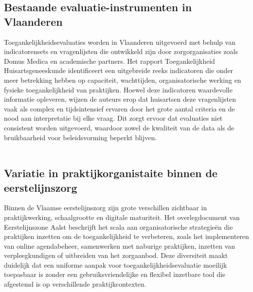 \subsection{Bestaande evaluatie-instrumenten in Vlaanderen}
\label{ter:Bestaande evaluatie-instrumenten in Vlaanderen}
Toegankelijkheidsevaluaties worden in Vlaanderen uitgevoerd met behulp van indicatorensets en vragenlijsten die ontwikkeld zijn door zorgorganisaties zoals Domus Medica en academische partners.
Het rapport Toegankelijkheid Huisartsgeneeskunde identificeert een uitgebreide reeks indicatoren die onder meer betrekking hebben op capaciteit, wachttijden, organisatorische werking en fysieke toegankelijkheid van praktijken.
Hoewel deze indicatoren waardevolle informatie opleveren, wijzen de auteurs erop dat huisartsen deze vragenlijsten vaak als complex en tijdsintensief ervaren door het grote aantal criteria en de nood aan interpretatie bij elke vraag.\autocite{Merckx2023}
Dit zorgt ervoor dat evaluaties niet consistent worden uitgevoerd, waardoor zowel de kwaliteit van de data als de bruikbaarheid voor beleidsvorming beperkt blijven.
\\\\
\subsection{Variatie in praktijkorganistaite binnen de eerstelijnszorg}
\label{ter:Variatie in praktijkorganistaite binnen de eerstelijnszorg}
Binnen de Vlaamse eerstelijnszorg zijn grote verschillen zichtbaar in praktijkwerking, schaalgrootte en digitale maturiteit.
Het overlegdocument \textcite{Rampelberg2025a} van Eerstelijnszone Aalst beschrijft het scala aan organisatorische strategieën die praktijken inzetten om de toegankelijkheid te verbeteren, zoals het implementeren van online agendabeheer, samenwerken met naburige praktijken, inzetten van verpleegkundigen of uitbreiden van het zorgaanbod.
Deze diversiteit maakt duidelijk dat een uniforme aanpak voor toegankelijkheidsevaluatie moeilijk toepasbaar is zonder een gebruiksvriendelijke en flexibel inzetbare tool die afgestemd is op verschillende praktijkcontexten.
\\\\
